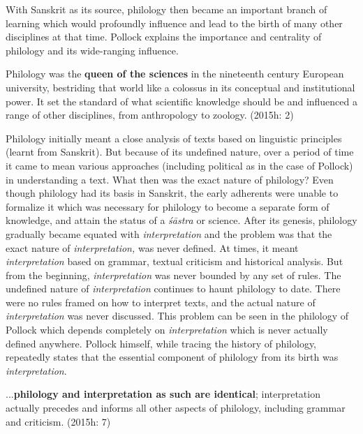 With Sanskrit as its source, philology then became an important branch of learning which would profoundly influence and lead to the birth of many other disciplines at that time. Pollock explains the importance and centrality of philology and its wide-ranging influence.

\begin{myquote}
Philology was the \textbf{queen of the sciences} in the nineteenth century European university, bestriding that world like a colossus in its conceptual and institutional power. It set the standard of what scientific knowledge should be and influenced a range of other disciplines, from anthropology to zoology. (2015h: 2)
\end{myquote}

Philology initially meant a close analysis of texts based on linguistic principles (learnt from Sanskrit). But because of its undefined nature, over a period of time it came to mean various approaches (including political as in the case of Pollock) in understanding a text. What then was the exact nature of philology? Even though philology had its basis in Sanskrit, the early adherents were unable to formalize it which was necessary for philology to become a separate form of knowledge, and attain the status of a \textit{śāstra} or science. After its genesis, philology gradually became equated with \textit{interpretation} and the problem was that the exact nature of \textit{interpretation,} was never defined. At times, it meant \textit{interpretation} based on grammar, textual criticism and historical analysis. But from the beginning,\textit{ interpretation} was never bounded by any set of rules. The undefined nature of \textit{interpretation} continues to haunt philology to date. There were no rules framed on how to interpret texts, and the actual nature of \textit{interpretation} was never discussed. This problem can be seen in the philology of Pollock which depends completely on \textit{interpretation} which is never actually defined anywhere. Pollock himself, while tracing the history of philology, repeatedly states that the essential component of philology from its birth was \textit{interpretation}.

\begin{myquote}
...\textbf{philology and interpretation as such are identical}; interpretation actually precedes and informs all other aspects of philology, including grammar and criticism. (2015h: 7)
\end{myquote}

